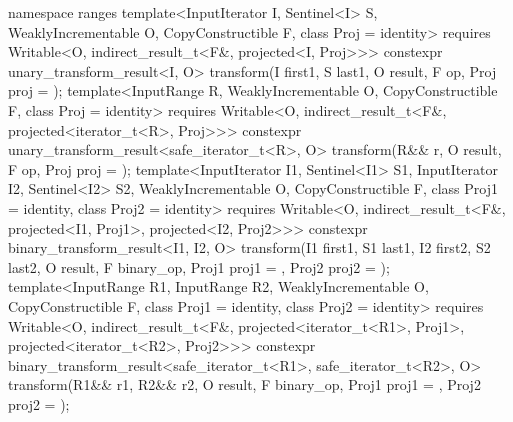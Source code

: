 \begin{itemdecl}
namespace ranges {
  template<InputIterator I, Sentinel<I> S, WeaklyIncrementable O,
      CopyConstructible F, class Proj = identity>
    requires Writable<O, indirect_result_t<F&, projected<I, Proj>>>
    constexpr unary_transform_result<I, O>
      transform(I first1, S last1, O result, F op, Proj proj = {});
  template<InputRange R, WeaklyIncrementable O, CopyConstructible F,
      class Proj = identity>
    requires Writable<O, indirect_result_t<F&,
      projected<iterator_t<R>, Proj>>>
    constexpr unary_transform_result<safe_iterator_t<R>, O>
      transform(R&& r, O result, F op, Proj proj = {});
  template<InputIterator I1, Sentinel<I1> S1, InputIterator I2, Sentinel<I2> S2,
      WeaklyIncrementable O, CopyConstructible F, class Proj1 = identity,
      class Proj2 = identity>
    requires Writable<O, indirect_result_t<F&, projected<I1, Proj1>,
      projected<I2, Proj2>>>
    constexpr binary_transform_result<I1, I2, O>
      transform(I1 first1, S1 last1, I2 first2, S2 last2, O result,
                F binary_op, Proj1 proj1 = {}, Proj2 proj2 = {});
  template<InputRange R1, InputRange R2, WeaklyIncrementable O,
      CopyConstructible F, class Proj1 = identity, class Proj2 = identity>
    requires Writable<O, indirect_result_t<F&,
      projected<iterator_t<R1>, Proj1>, projected<iterator_t<R2>, Proj2>>>
    constexpr binary_transform_result<safe_iterator_t<R1>, safe_iterator_t<R2>, O>
      transform(R1&& r1, R2&& r2, O result,
                F binary_op, Proj1 proj1 = {}, Proj2 proj2 = {});
}
\end{itemdecl}

